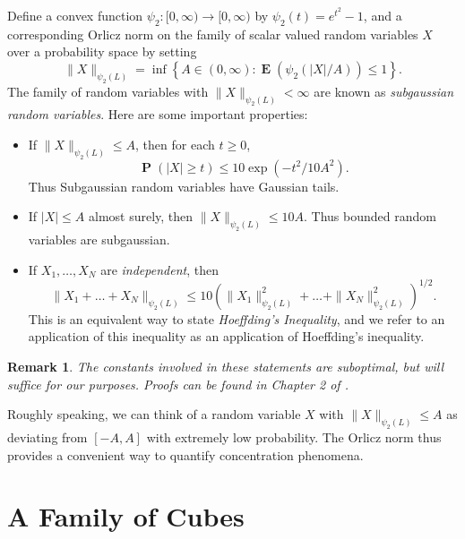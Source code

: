 \documentclass[12pt,reqno]{article}
\numberwithin{equation}{section}
\newtheorem{remark}[theorem]{Remark}
\DeclareMathOperator{\EE}{\mathbf{E}}
\DeclareMathOperator{\PP}{\mathbf{P}}
\newcommand{\psitwo}[1]{\| {#1} \|_{\psi_2(L)}}
\begin{document}
Define a convex function $\psi_2: [0,\infty) \to [0,\infty)$ by $\psi_2(t) = e^{t^2} - 1$, and a corresponding Orlicz norm on the family of scalar valued random variables $X$ over a probability space by setting
%
\[ \psitwo{X} = \inf \left\{ A \in (0,\infty) : \EE(\psi_2(|X|/A)) \leq 1 \right\}. \]
%
The family of random variables with $\psitwo{X} < \infty$ are known as \emph{subgaussian random variables}. Here are some important properties:
%
\begin{itemize}
	\item If $\psitwo{X} \leq A$, then for each $t \geq 0$,
	\[ \PP \left( |X| \geq t \right) \leq 10 \exp \left( -t^2/10A^2 \right). \]
    Thus Subgaussian random variables have Gaussian tails.

	\item If $|X| \leq A$ almost surely, then $\psitwo{X} \leq 10 A$. Thus bounded random variables are subgaussian.

	
	
	\item If $X_1, \dots, X_N$ are \emph{independent}, then
	\[ \psitwo{X_1 + \dots + X_N} \leq 10 \left( \psitwo{X_1}^2 + \dots + \psitwo{X_N}^2 \right)^{1/2}. \]
    This is an equivalent way to state \emph{Hoeffding's Inequality}, and we refer to an application of this inequality as an application of Hoeffding's inequality.
\end{itemize}

\begin{remark}
    The constants involved in these statements are suboptimal, but will suffice for our purposes. Proofs can be found in Chapter 2 of \cite{Vershynin}.
\end{remark}

Roughly speaking, we can think of a random variable $X$ with $\psitwo{X} \leq A$ as deviating from $[-A,A]$ with extremely low probability. The Orlicz norm thus provides a convenient way to quantify concentration phenomena.

\section{A Family of Cubes}
\end{document}
